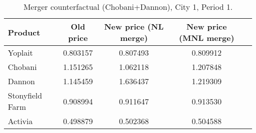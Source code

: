\begin{table}[H]
\centering
\caption{Merger counterfactual (Chobani+Dannon), City 1, Period 1.}
\begin{tabular}{lcccc}
\toprule
Product & Old price & New price (NL merge) & New price (MNL merge) \\
\midrule
Yoplait & 0.803157 & 0.807493 & 0.809912 \\
Chobani & 1.151265 & 1.062118 & 1.207848 \\
Dannon & 1.145459 & 1.636437 & 1.219309 \\
Stonyfield Farm & 0.908994 & 0.911647 & 0.913530 \\
Activia & 0.498879 & 0.502368 & 0.504588 \\
\bottomrule
\end{tabular}
\label{tab:q23_nl_merge}
\end{table}
